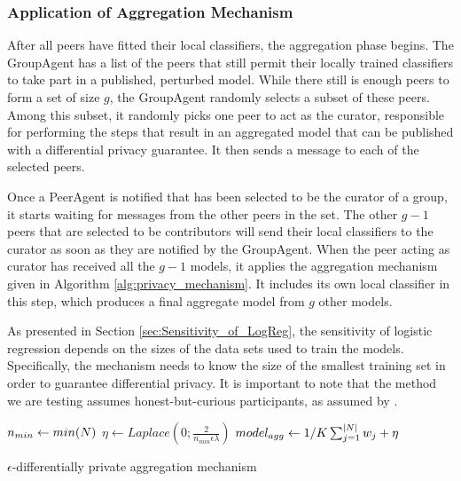 \subsubsection{Application of Aggregation Mechanism}

After all peers have fitted their local classifiers, the aggregation phase begins. The GroupAgent has a list of the peers that still permit their locally trained classifiers to take part in a published, perturbed model. While there still is enough peers to form a set of size $g$, the GroupAgent randomly selects a subset of these peers. Among this subset, it randomly picks one peer to act as the curator, responsible for performing the steps that result in an aggregated model that can be published with a differential privacy guarantee. It then sends a message to each of the selected peers.

Once a PeerAgent is notified that has been selected to be the curator of a group, it starts waiting for messages from the other peers in the set. The other $g-1$ peers that are selected to be contributors will send their local classifiers to the curator as soon as they are notified by the GroupAgent. When the peer acting as curator has received all the $g-1$ models, it applies the aggregation mechanism given in Algorithm \ref{alg:privacy_mechanism}. It includes its own local classifier in this step, which produces a final aggregate model from $g$ other models. 

As presented in Section \ref{sec:Sensitivity_of_LogReg}, the sensitivity of logistic regression depends on the sizes of the data sets used to train the models. Specifically, the mechanism needs to know the size of the smallest training set in order to guarantee differential privacy. It is important to note that the method we are testing assumes honest-but-curious participants, as assumed by \cite{pathak2010diffprivhomo}.


\begin{algorithm}[!h]
	\label{alg:privacy_mechanism}
		$n_{min} \leftarrow min(\boldmath{N})$\;
		$\eta \leftarrow Laplace(0; \frac{2}{n_{min}\epsilon\lambda})$\;
		$model_{agg} \leftarrow 1/K\sum_{j=1}^{|\boldmath{N}|} \boldmath{w_j} + \boldmath{\eta}$\;
		
\caption{$\epsilon$-differentially private aggregation mechanism}
\end{algorithm}


